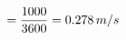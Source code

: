 \documentclass[preview]{standalone}
\begin{document}
\begin{align*}
\special{dvisvgm:raw <g id='unique000'>}= \frac{1000}{3600} = 0.278\,m/s\special{dvisvgm:raw </g>}
\end{align*}
\end{document}
